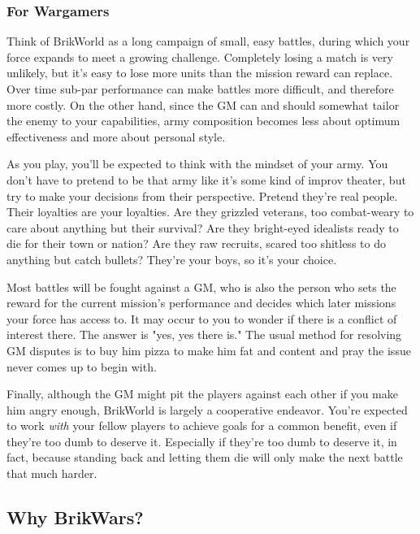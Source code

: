 \documentclass[12pt,a4paper,twocolumn]{article}
\begin{document}
\subsubsection{For Wargamers}
Think of BrikWorld as a long campaign of small, easy battles, during which your force expands to meet a growing challenge. Completely losing a match is very unlikely, but it's easy to lose more units than the mission reward can replace.  Over time sub-par performance can make battles more difficult, and therefore more costly.  On the other hand, since the GM can and should somewhat tailor the enemy to your capabilities, army composition becomes less about optimum effectiveness and more about personal style. 

As you play, you'll be expected to think with the mindset of your army.  You don't have to pretend to be that army like it's some kind of improv theater, but try to make your decisions from their perspective.  Pretend they're real people.  Their loyalties are your loyalties.  Are they grizzled veterans, too combat-weary to care about anything but their survival?   Are they bright-eyed idealists ready to die for their town or nation?  Are they raw recruits, scared too shitless to do anything but catch bullets?  They're your boys, so it's your choice.

Most battles will be fought against a GM, who is also the person who sets the reward for the current mission's performance and decides which later missions your force has access to.  It may occur to you to wonder if there is a conflict of interest there.  The answer is "yes, yes there is."  The usual method for resolving GM disputes is to buy him pizza to make him fat and content and pray the issue never comes up to begin with.

Finally, although the GM might pit the players against each other if you make him angry enough, BrikWorld is largely a cooperative endeavor.  You're expected to work {\em with} your fellow players to achieve goals for a common benefit, even if they're too dumb to deserve it.  Especially if they're too dumb to deserve it, in fact, because standing back and letting them die will only make the next battle that much harder.

\subsection{Why BrikWars?}
\end{document}
